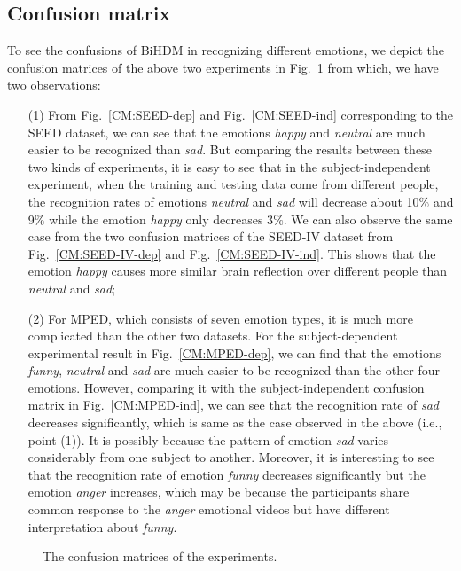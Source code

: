 \documentclass[journal]{IEEEtran}
\begin{document}
\subsection{Confusion matrix}
To see the confusions of BiHDM in recognizing different emotions, we depict the confusion matrices of the above two experiments in Fig.~\ref{Fig: CM} from which, we have two observations:
\begin{itemize}
	\item [(1)] From Fig.~\ref{CM:SEED-dep} and Fig.~\ref{CM:SEED-ind} corresponding to the SEED dataset, we can see that the emotions \textit{happy} and \textit{neutral} are much easier to be recognized than \textit{sad}. But comparing the results between these two kinds of experiments, it is easy to see that in the subject-independent experiment, when the training and testing data come from different people, the recognition rates of emotions \textit{neutral} and \textit{sad} will decrease about 10$\%$ and 9$\%$ while the emotion \textit{happy} only decreases 3$\%$. We can also observe the same case from the two confusion matrices of the SEED-IV dataset from Fig.~\ref{CM:SEED-IV-dep} and Fig.~\ref{CM:SEED-IV-ind}. This shows that the emotion \textit{happy} causes more similar brain reflection over different people than \textit{neutral} and \textit{sad};
	\item [(2)] For MPED, which consists of seven emotion types, it is much more complicated than the other two datasets. For the subject-dependent experimental result in Fig.~\ref{CM:MPED-dep}, we can find that the emotions \textit{funny}, \textit{neutral} and \textit{sad} are much easier to be recognized than the other four emotions. However, comparing it with the subject-independent confusion matrix in Fig.~\ref{CM:MPED-ind}, we can see that the recognition rate of \textit{sad} decreases significantly, which is same as the case observed in the above (i.e., point (1)). It is possibly because the pattern of emotion \textit{sad} varies considerably from one subject to another. Moreover, it is interesting to see that the recognition rate of emotion \textit{funny} decreases significantly but the emotion \textit{anger} increases, which may be because the participants share common response to the \textit{anger} emotional videos but have different interpretation about \textit{funny}.
\end{itemize}
\begin{figure}[htb]
	\centering
	\caption*{(1) Subject-dependent experiment results}
	\caption*{(2) Subject-independent experiment results}
	\caption{The confusion matrices of the experiments.}
	\label{Fig: CM}
\end{figure}
\end{document}
